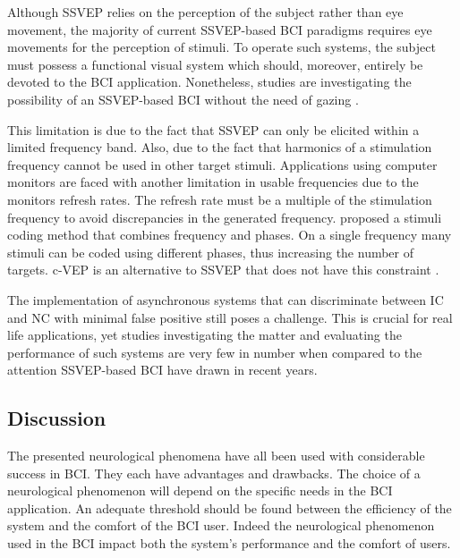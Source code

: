 Although SSVEP relies on the perception of the subject rather than eye movement, the majority of current SSVEP-based BCI paradigms requires eye movements for the perception of stimuli. 
To operate such systems, the subject must possess a functional visual system which should, moreover, entirely be devoted to the BCI application. 
Nonetheless, studies are investigating the possibility of an SSVEP-based BCI without the need of gazing \citep{lopez-gordo_high_2010}.
\par
This limitation is due to the fact that SSVEP can only be elicited within a limited frequency band. 
Also, due to the fact that harmonics of a stimulation frequency cannot be used in other target stimuli. 
Applications using computer monitors are faced with another limitation in usable frequencies due to the monitors refresh rates. 
The refresh rate must be a multiple of the stimulation frequency to avoid discrepancies in the generated frequency. 
\cite{jia_frequency_2011} proposed a stimuli coding method that combines frequency and phases. 
On a single frequency many stimuli can be coded using different phases, thus increasing the number of targets.
c-VEP is an alternative to SSVEP that does not have this constraint \citep{spuler_one_2012}.
\par
The implementation of asynchronous systems that can discriminate between IC and NC with minimal false positive still poses a challenge. 
This is crucial for real life applications, yet studies investigating the matter and evaluating the performance of such systems are very few in number when
compared to the attention SSVEP-based BCI have drawn in recent years.

\goodbreak

\subsection{Discussion}
\label{subsec:neur_pheno_discussion}

The presented neurological phenomena have all been used with considerable success in BCI. 
They each have advantages and drawbacks.
The choice of a neurological phenomenon will depend on the specific needs in the BCI application.
An adequate threshold should be found between the efficiency of the system and the comfort of the BCI user.
Indeed the neurological phenomenon used in the BCI impact both the system's performance and the comfort of users.

